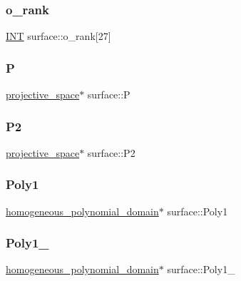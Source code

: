 \subsubsection{\texorpdfstring{o\+\_\+rank}{o\_rank}}
{\footnotesize\ttfamily \mbox{\hyperlink{galois_8h_a09fddde158a3a20bd2dcadb609de11dc}{I\+NT}} surface\+::o\+\_\+rank\mbox{[}27\mbox{]}}

\mbox{\label{classsurface_a90a72158e9c87d4700c84815916a3f1e}} 
\subsubsection{\texorpdfstring{P}{P}}
{\footnotesize\ttfamily \mbox{\hyperlink{classprojective__space}{projective\+\_\+space}}$\ast$ surface\+::P}

\mbox{\label{classsurface_a369a004b26d006408ca0878b1e9b5c59}} 
\subsubsection{\texorpdfstring{P2}{P2}}
{\footnotesize\ttfamily \mbox{\hyperlink{classprojective__space}{projective\+\_\+space}}$\ast$ surface\+::\+P2}

\mbox{\label{classsurface_a2b3e2e0e798e9323a1cb90e5e7de3c55}} 
\subsubsection{\texorpdfstring{Poly1}{Poly1}}
{\footnotesize\ttfamily \mbox{\hyperlink{classhomogeneous__polynomial__domain}{homogeneous\+\_\+polynomial\+\_\+domain}}$\ast$ surface\+::\+Poly1}

\mbox{\label{classsurface_a623f0731b7a1dc82f8b76c468eabdf24}} 
\subsubsection{\texorpdfstring{Poly1\+\_}{Poly1\_4}}
{\footnotesize\ttfamily \mbox{\hyperlink{classhomogeneous__polynomial__domain}{homogeneous\+\_\+polynomial\+\_\+domain}}$\ast$ surface\+::\+Poly1\+\_}


